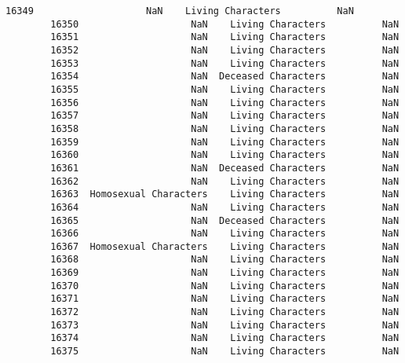 \documentclass[11pt]{article}
\begin{document}
\begin{Verbatim}[commandchars=\\\{\}]
        16349                    NaN    Living Characters          NaN   
        16350                    NaN    Living Characters          NaN   
        16351                    NaN    Living Characters          NaN   
        16352                    NaN    Living Characters          NaN   
        16353                    NaN    Living Characters          NaN   
        16354                    NaN  Deceased Characters          NaN   
        16355                    NaN    Living Characters          NaN   
        16356                    NaN    Living Characters          NaN   
        16357                    NaN    Living Characters          NaN   
        16358                    NaN    Living Characters          NaN   
        16359                    NaN    Living Characters          NaN   
        16360                    NaN    Living Characters          NaN   
        16361                    NaN  Deceased Characters          NaN   
        16362                    NaN    Living Characters          NaN   
        16363  Homosexual Characters    Living Characters          NaN   
        16364                    NaN    Living Characters          NaN   
        16365                    NaN  Deceased Characters          NaN   
        16366                    NaN    Living Characters          NaN   
        16367  Homosexual Characters    Living Characters          NaN   
        16368                    NaN    Living Characters          NaN   
        16369                    NaN    Living Characters          NaN   
        16370                    NaN    Living Characters          NaN   
        16371                    NaN    Living Characters          NaN   
        16372                    NaN    Living Characters          NaN   
        16373                    NaN    Living Characters          NaN   
        16374                    NaN    Living Characters          NaN   
        16375                    NaN    Living Characters          NaN   
        

\end{Verbatim}
\end{document}
